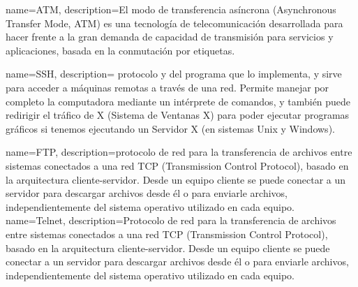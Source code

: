 




{
name=ATM,
description={El modo de transferencia asíncrona (Asynchronous Transfer Mode, ATM) es una tecnología de telecomunicación desarrollada para hacer frente a la gran demanda de capacidad de transmisión para servicios y aplicaciones, basada en la conmutación por etiquetas.}
}



{
name=SSH,
description={ protocolo y del programa que lo implementa, y sirve para acceder a máquinas remotas a través de una red. Permite manejar por completo la computadora mediante un intérprete de comandos, y también puede redirigir el tráfico de X (Sistema de Ventanas X) para poder ejecutar programas gráficos si tenemos ejecutando un Servidor X (en sistemas Unix y Windows).}
}


{
name=FTP,
description={protocolo de red para la transferencia de archivos entre sistemas conectados a una red TCP (Transmission Control Protocol), basado en la arquitectura cliente-servidor. Desde un equipo cliente se puede conectar a un servidor para descargar archivos desde él o para enviarle archivos, independientemente del sistema operativo utilizado en cada equipo.}
}
{
name=Telnet,
description={Protocolo de red para la transferencia de archivos entre sistemas conectados a una red TCP (Transmission Control Protocol), basado en la arquitectura cliente-servidor. Desde un equipo cliente se puede conectar a un servidor para descargar archivos desde él o para enviarle archivos, independientemente del sistema operativo utilizado en cada equipo.}
}

